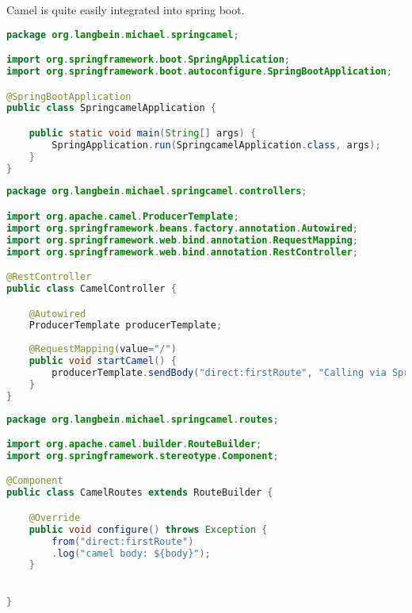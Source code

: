 Camel is quite easily integrated into spring boot. 

\begin{lstlisting}[language=java]
package org.langbein.michael.springcamel;

import org.springframework.boot.SpringApplication;
import org.springframework.boot.autoconfigure.SpringBootApplication;

@SpringBootApplication
public class SpringcamelApplication {

	public static void main(String[] args) {
		SpringApplication.run(SpringcamelApplication.class, args);
	}
}
\end{lstlisting}

\begin{lstlisting}[language=java]
package org.langbein.michael.springcamel.controllers;

import org.apache.camel.ProducerTemplate;
import org.springframework.beans.factory.annotation.Autowired;
import org.springframework.web.bind.annotation.RequestMapping;
import org.springframework.web.bind.annotation.RestController;

@RestController
public class CamelController {

	@Autowired
	ProducerTemplate producerTemplate;
	
	@RequestMapping(value="/")
	public void startCamel() {
		producerTemplate.sendBody("direct:firstRoute", "Calling via Spring Boot Rest Controller");
	}
}
\end{lstlisting}

\begin{lstlisting}[language=java]
package org.langbein.michael.springcamel.routes;

import org.apache.camel.builder.RouteBuilder;
import org.springframework.stereotype.Component;

@Component
public class CamelRoutes extends RouteBuilder {

	@Override
	public void configure() throws Exception {
		from("direct:firstRoute")
		.log("camel body: ${body}");
	}

	
}
\end{lstlisting}